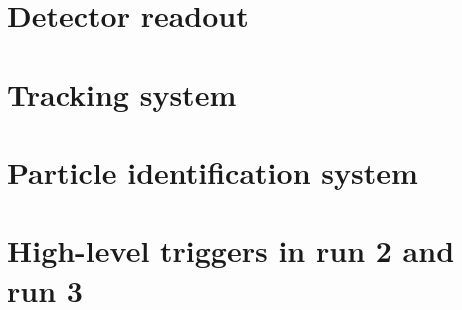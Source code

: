 \section{Detector readout}
\label{ref:lhcb-upgrade-overview:readout}


\section{Tracking system}
\label{ref:lhcb-upgrade-overview:tracking}



\section{Particle identification system}
\label{ref:lhcb-upgrade-overview:tracking}


\section{High-level triggers in run 2 and run 3}
\label{ref:lhcb-upgrade-overview:hlt}
